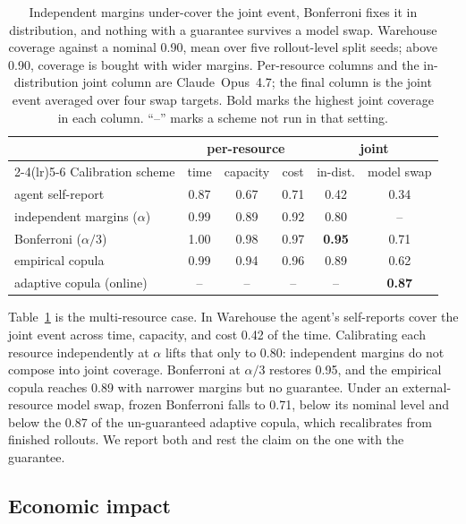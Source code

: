 \begin{table}[H]
\centering
\caption{Independent margins under-cover the joint event, Bonferroni fixes it in distribution, and nothing with a guarantee survives a model swap. Warehouse coverage against a nominal 0.90, mean over five rollout-level split seeds; above 0.90, coverage is bought with wider margins. Per-resource columns and the in-distribution joint column are Claude~Opus~4.7; the final column is the joint event averaged over four swap targets. Bold marks the highest joint coverage in each column. ``--'' marks a scheme not run in that setting.}
\label{tab:joint}
\small
\begin{tabular}{@{}lccccc@{}}
\toprule
& \multicolumn{3}{c}{per-resource} & \multicolumn{2}{c}{joint} \\
\cmidrule(lr){2-4}\cmidrule(lr){5-6}
Calibration scheme & time & capacity & cost & in-dist. & model swap \\
\midrule
agent self-report & 0.87 & 0.67 & 0.71 & 0.42 & 0.34 \\
independent margins ($\alpha$) & 0.99 & 0.89 & 0.92 & 0.80 & -- \\
Bonferroni ($\alpha/3$) & 1.00 & 0.98 & 0.97 & \textbf{0.95} & 0.71 \\
empirical copula & 0.99 & 0.94 & 0.96 & 0.89 & 0.62 \\
adaptive copula (online) & -- & -- & -- & -- & \textbf{0.87} \\
\bottomrule
\end{tabular}
\end{table}

Table~\ref{tab:joint} is the multi-resource case. In Warehouse the agent's self-reports cover the joint event across time, capacity, and cost 0.42 of the time. Calibrating each resource independently at $\alpha$ lifts that only to 0.80: independent margins do not compose into joint coverage. Bonferroni at $\alpha/3$ restores 0.95, and the empirical copula reaches 0.89 with narrower margins but no guarantee. Under an external-resource model swap, frozen Bonferroni falls to 0.71, below its nominal level and below the 0.87 of the un-guaranteed adaptive copula, which recalibrates from finished rollouts. We report both and rest the claim on the one with the guarantee.

\subsection{Economic impact}
\label{sec:econ}

